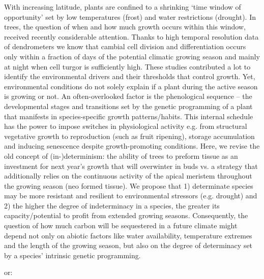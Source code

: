 \documentclass{article}
\begin{document}
	With increasing latitude, plants are confined to a shrinking ‘time window of opportunity’ set by low temperatures (frost) and water restrictions (drought). In trees, the question of when and how much growth occurs within this window, received recently considerable attention. Thanks to high temporal resolution data of dendrometers we know that cambial cell division and differentiation occurs only within a fraction of days of the potential climatic growing season and mainly at night when cell turgor is sufficiently high. These studies contributed a lot to identify the environmental drivers and their thresholds that control growth. 
	Yet, environmental conditions do not solely explain if a plant during the active season is growing or not. An often-overlooked factor is the phenological sequence – the developmental stages and transitions set by the genetic programming of a plant that manifests in species-specific growth patterns/habits. This internal schedule has the power to impose switches in physiological activity e.g. from structural vegetative growth to reproduction (such as fruit ripening), storage accumulation and inducing senescence despite growth-promoting conditions.
	Here, we revise the old concept of (in-)determinism: the ability of trees to preform tissue as an investment for next year’s growth that will overwinter in buds vs. a strategy that additionally relies on the continuous activity of the apical meristem throughout the growing season (neo formed tissue). We propose that 1) determinate species may be more resistant and resilient to environmental stressors (e.g. drought) and 2) the higher the degree of indeterminacy in a species, the greater its capacity/potential to profit from extended growing seasons. Consequently, the question of how much carbon will be sequestered in a future climate might depend not only on abiotic factors like water availability, temperature extremes and the length of the growing season, but also on the degree of determinacy set by a species' intrinsic genetic programming.
	
	or:
	
\end{document}

